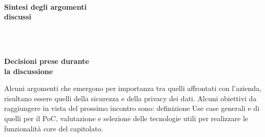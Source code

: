 \documentclass[10pt, a4paper]{article}
\title{\data}
\author{SWEetCode}
\begin{document}


\setlength{\columnsep}{2.2em}
\setlength{\columnseprule}{4pt}
\begin{paracol}{2}


\intestazione
\vspace{5.0em}

\partecipanti

\newpage

\switchcolumn
\revisioneAzioni
\vspace{21em}

\ordineGiorno

\newpage


\switchcolumn

\\
\textbf{Sintesi degli argomenti\\discussi}

~\newpage


\\
\textbf{Decisioni prese durante\\la discussione}

\switchcolumn

\discussione
Alcuni argomenti che emergono per importanza tra quelli affrontati con l'azienda, risultano essere quelli della sicurezza e della privacy dei dati.
Alcuni obiettivi da raggiungere in vista del prossimo incontro sono: definizione Use case generali e di quelli per il PoC, valutazione e selezione delle tecnologie utili per realizzare le funzionalità core del capitolato.

\vspace{12.5em}

\decisioni

\end{paracol}

\vspace{7em}
\end{document}

